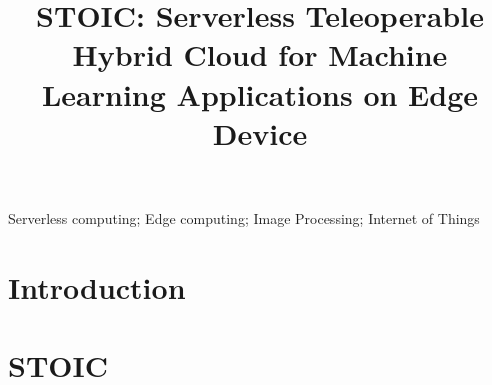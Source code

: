 \documentclass[10pt, conference]{IEEEtran}
\begin{document}
\title{STOIC: Serverless Teleoperable Hybrid Cloud for Machine Learning Applications on Edge Device}

\author{
}




\maketitle

\begin{abstract}
\label{sec:abstract}

\end{abstract}

\begin{IEEEkeywords}
Serverless computing; Edge computing; Image Processing; Internet of Things
\end{IEEEkeywords}


%
\IEEEpeerreviewmaketitle

\section{Introduction}
\label{sec:intro}


%

\section{STOIC}
\label{sec:STOIC}

\end{document}
